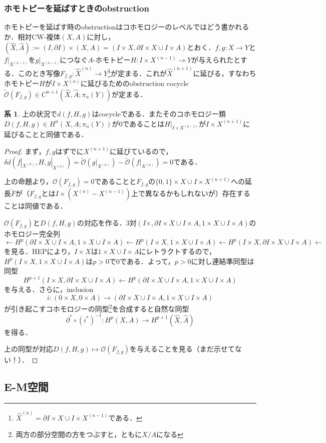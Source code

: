 \documentclass[a4paper,11pt]{jsarticle}
\theoremstyle{definition}
\newtheorem{cor}[thm]{系}
\begin{document}
\subsubsection{ホモトピーを延ばすときのobstruction}

ホモトピーを延ばす時のobstructionはコホモロジーのレベルではどう書かれるか．相対CW-複体$(X,A)$に対し，$(\hat{X},\hat{A}):=(I,\partial I)\times(X,A)=(I\times X,\partial I\times X\cup I\times A)$とおく．$f,g\colon X\to Y$と$f|_{X^{(n-1)}}$を$g|_{X^{(n-1)}}$につなぐ$A$-ホモトピー$H\colon I\times X^{(n-1)}\to Y$が与えられたとする．このとき写像$F_{f,g}\colon \hat{X}^{(n)}\to Y$\footnote{$\hat{X}^{(n)}=\partial I\times X\cup I\times X^{(n-1)}$である．}が定まる．これが$\hat{X}^{(n+1)}$に延びる，すなわちホモトピー$H$が$I\times X^{(n)}$に延びるためのobstruction cocycle $\tilde{\mathcal{O}}(F_{f,g})\in C^{n+1}(\hat{X},\hat{A};\pi_n(Y))$が定まる．
\begin{cor}
  上の状況で$d(f,H,g)$はcocycleである．またそのコホモロジー類$D(f,H,g)\in H^{n}(X,A;\pi_n(Y))$が0であることは$H|_{I\times X^{(n-1)}}$が$I\times X^{(n+1)}$に延びることと同値である．
\end{cor}
\begin{proof}
  まず，$f,g$はずでに$X^{(n+1)}$に延びているので，$\delta d(f|_{X^{(n)}},H,g|_{X^{(n)}})=\tilde{\mathcal{O}}(g|_{X^{(n)}})-\tilde{\mathcal{O}}(f|_{X^{(n)}})=0$である．

  上の命題より，$\mathcal{O}(F_{f,g})=0$であることと$F_{f,g}$の$\{0,1\}\times X\cup I\times X^{(n+1)}$への延長$\tilde{F}$が（$F_{f,g}$とは$I\times (X^{(n)}-X^{(n-1)})$上で異なるかもしれないが）存在することは同値である．

  $\mathcal{O}(F_{f,g})$と$D(f,H,g)$の対応を作る．3対$(I\times ,\partial I\times X\cup I\times A,1\times X\cup I\times A)$のホモロジー完全列\[
    \leftarrow H^p(\partial I\times X\cup I\times A,1\times X\cup I\times A)
    \leftarrow H^p(I\times X,1\times X\cup I\times A)
    \leftarrow H^p(I\times X,\partial I\times X\cup I\times A)
    \leftarrow
  \]
  を見る．HEPにより，$I\times X$は$1\times X\cup I\times A$にレトラクトするので，$H^p(I\times X,1\times X\cup I\times A)$は$p>0$で$0$である．よって，$p>0$に対し連結準同型は同型
  \[
    H^{p+1}(I\times X,\partial I\times X\cup I\times A)
    \leftarrow H^p(\partial I\times X\cup I\times A,1\times X\cup I\times A)
  \]
  を与える．さらに，inclusion
  \[
    i\colon (0\times X,0\times A)\rightarrow (\partial I\times X\cup I\times A,1\times X\cup I\times A)
  \]
  が引き起こすコホモロジーの同型\footnote{両方の部分空間の方をつぶすと，ともに$X/A$になる}を合成すると自然な同型
  \[
    \partial^*\circ (i^*)^{-1}\colon H^p(X,A)\to H^{p+1}(\hat{X},\hat{A})
  \]
  を得る．

  上の同型が対応$D(f,H,g)\mapsto \mathcal{O}(F_{f,g})$を与えることを見る（{\color{red}まだ示せてない！}）．
\end{proof}
\subsection{E-M空間}




\printindex
\end{document}
